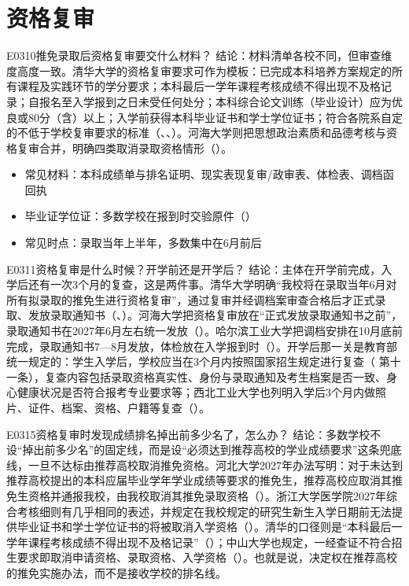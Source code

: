 \section{资格复审}
\begin{qa}{E0310}{推免录取后资格复审要交什么材料？}
结论：材料清单各校不同，但审查维度高度一致。清华大学的资格复审要求可作为模板：已完成本科培养方案规定的所有课程及实践环节的学分要求；本科最后一学年课程考核成绩不得出现不及格记录；自报名至入学报到之日未受任何处分；本科综合论文训练（毕业设计）应为优良或80分（含）以上；入学前获得本科毕业证书和学士学位证书；符合各院系自定的不低于学校复审要求的标准（、、）。河海大学则把思想政治素质和品德考核与资格复审合并，明确四类取消录取资格情形（）。

\begin{itemize}
  \item 常见材料：本科成绩单与排名证明、现实表现复审/政审表、体检表、调档函回执
  \item 毕业证学位证：多数学校在报到时交验原件（）
  \item 常见时点：录取当年上半年，多数集中在6月前后
\end{itemize}
\end{qa}

\begin{qa}{E0311}{资格复审是什么时候？开学前还是开学后？}
结论：主体在开学前完成，入学后还有一次3个月的复查，这是两件事。清华大学明确“我校将在录取当年6月对所有拟录取的推免生进行资格复审”，通过复审并经调档案审查合格后才正式录取、发放录取通知书（、）。河海大学把资格复审放在“正式发放录取通知书之前”，录取通知书在2027年6月左右统一发放（）。哈尔滨工业大学把调档安排在10月底前完成，录取通知书7—8月发放，体检放在入学报到时（）。开学后那一关是教育部统一规定的：学生入学后，学校应当在3个月内按照国家招生规定进行复查（ 第十一条），复查内容包括录取资格真实性、身份与录取通知及考生档案是否一致、身心健康状况是否符合报考专业要求等；西北工业大学也列明入学后3个月内做照片、证件、档案、资格、户籍等复查（）。
\end{qa}

\begin{qa}{E0315}{资格复审时发现成绩排名掉出前多少名了，怎么办？}
结论：多数学校不设“掉出前多少名”的固定线，而是设“必须达到推荐高校的学业成绩要求”这条兜底线，一旦不达标由推荐高校取消推免资格。河北大学2027年办法写明：对于未达到推荐高校提出的本科应届毕业学年学业成绩等要求的推免生，推荐高校应取消其推免生资格并通报我校，由我校取消其推免录取资格（）。浙江大学医学院2027年综合考核细则有几乎相同的表述，并规定在我校规定的研究生新生入学日期前无法提供毕业证书和学士学位证书的将被取消入学资格（）。清华的口径则是“本科最后一学年课程考核成绩不得出现不及格记录”（）；中山大学也规定，一经查证不符合招生要求即取消申请资格、录取资格、入学资格（）。也就是说，决定权在推荐高校的推免实施办法，而不是接收学校的排名线。
\end{qa}

